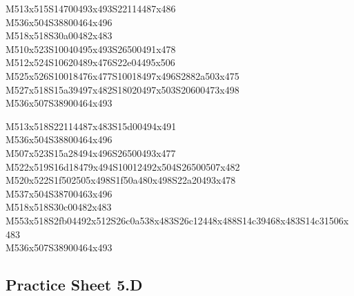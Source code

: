 \documentclass{article}
\begin{document}
\begin{multicols}{5}
\begin{center}
M513x515S14700493x493S22114487x486 %
\\M536x504S38800464x496 %
\\M518x518S30a00482x483 %
\\M510x523S10040495x493S26500491x478 %
\\M512x524S10620489x476S22e04495x506 %
\\M525x526S10018476x477S10018497x496S2882a503x475 %
\\M527x518S15a39497x482S18020497x503S20600473x498 %
\\M536x507S38900464x493 %
\vfil
\columnbreak

M513x518S22114487x483S15d00494x491 %
\\M536x504S38800464x496 %
\\M507x523S15a28494x496S26500493x477 %
\\M522x519S16d18479x494S10012492x504S26500507x482 %
\\M520x522S1f502505x498S1f50a480x498S22a20493x478 %
\\M537x504S38700463x496 %
\\M518x518S30c00482x483 %
\\M553x518S2fb04492x512S26c0a538x483S26c12448x488S14c39468x483S14c31506x483 %
\\M536x507S38900464x493 %
\vfil

\end{center}
\end{multicols}

\subsection{Practice Sheet 5.D}
\end{document}
